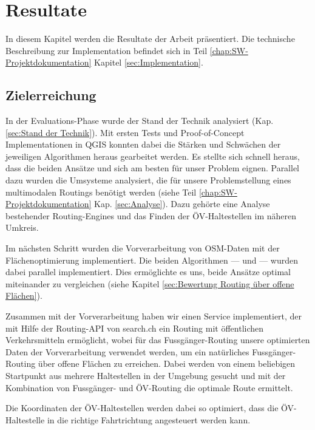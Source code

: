 \section{Resultate}
\label{sec:Resultate}

In diesem Kapitel werden die Resultate der Arbeit präsentiert. Die technische Beschreibung zur Implementation befindet sich in Teil \ref{chap:SW-Projektdokumentation} Kapitel \ref{sec:Implementation}.

\subsection{Zielerreichung}
\label{sub:Zielerreichung}

In der Evaluations-Phase wurde der Stand der Technik analysiert (Kap. \ref{sec:Stand der Technik}). Mit ersten Tests und Proof-of-Concept Implementationen in QGIS konnten dabei die Stärken und Schwächen der jeweiligen Algorithmen heraus gearbeitet werden. Es stellte sich schnell heraus, dass die beiden Ansätze  und  sich am besten für unser Problem eignen. Parallel dazu wurden die Umsysteme analysiert, die für unsere Problemstellung eines multimodalen Routings benötigt werden (siehe Teil \ref{chap:SW-Projektdokumentation} Kap. \ref{sec:Analyse}). Dazu gehörte eine Analyse bestehender Routing-Engines und das Finden der ÖV-Haltestellen im näheren Umkreis.

Im nächsten Schritt wurden die Vorverarbeitung von \ac{OSM}-Daten mit der Flächenoptimierung implementiert. Die beiden Algorithmen ---  und  --- wurden dabei parallel implementiert. Dies ermöglichte es uns, beide Ansätze optimal miteinander zu vergleichen (siehe Kapitel \ref{sec:Bewertung Routing über offene Flächen}).

Zusammen mit der Vorverarbeitung haben wir einen Service \cite{github:PlazaRoute} implementiert, der mit Hilfe der Routing-API von search.ch \cite{search_ch_route_api} ein Routing mit öffentlichen Verkehrsmitteln ermöglicht, wobei für das Fussgänger-Routing unsere optimierten Daten der Vorverarbeitung verwendet werden, um ein natürliches Fussgänger-Routing über offene Flächen zu erreichen. Dabei werden von einem beliebigen Startpunkt aus mehrere Haltestellen in der Umgebung gesucht und mit der Kombination von Fussgänger- und ÖV-Routing die optimale Route ermittelt.

Die Koordinaten der ÖV-Haltestellen werden dabei so optimiert, dass die ÖV-Haltestelle in die richtige Fahrtrichtung angesteuert werden kann.

